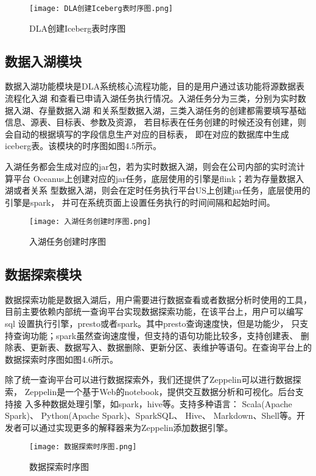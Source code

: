 \begin{figure}[h]
  \centering
  \texttt{[image: DLA创建Iceberg表时序图.png]}
  \caption{DLA创建Iceberg表时序图}
  \label{fig:badge}
\end{figure}

\subsection{数据入湖模块}

数据入湖功能模块是DLA系统核心流程功能，目的是用户通过该功能将源数据表流程化入湖
和查看已申请入湖任务执行情况。入湖任务分为三类，分别为实时数据入湖、存量数据入湖
和关系型数据入湖，三类入湖任务的创建都需要填写基础信息、源表、目标表、参数及资源，
若目标表在任务创建的时候还没有创建，则会自动的根据填写的字段信息生产对应的目标表，
即在对应的数据库中生成iceberg表。该模块的时序图如图4.5所示。

入湖任务都会生成对应的jar包，若为实时数据入湖，则会在公司内部的实时流计算平台
Oceanus上创建对应的jar任务，底层使用的引擎是flink；若为存量数据入湖或者关系
型数据入湖，则会在定时任务执行平台US上创建jar任务，底层使用的引擎是spark，
并可在系统页面上设置任务执行的时间间隔和起始时间。

\begin{figure}[h]
  \centering
  \texttt{[image: 入湖任务创建时序图.png]}
  \caption{入湖任务创建时序图}
  \label{fig:badge}
\end{figure}

\subsection{数据探索模块}

数据探索功能是数据入湖后，用户需要进行数据查看或者数据分析时使用的工具，
目前主要依赖内部统一查询平台实现数据探索功能，在该平台上，用户可以编写sql
设置执行引擎，presto或者spark。其中presto查询速度快，但是功能少，
只支持查询功能；spark虽然查询速度慢，但支持的语句功能比较多，支持创建表、
删除表、更新表、数据写入、数据删除、更新分区、表维护等语句。在查询平台上的数据探索时序图如图4.6所示。

除了统一查询平台可以进行数据探索外，我们还提供了Zeppelin可以进行数据探索，
Zeppelin是一个基于Web的notebook，提供交互数据分析和可视化。后台支持接
入多种数据处理引擎，如spark，hive等。支持多种语言： Scala(Apache Spark)、
Python(Apache Spark)、SparkSQL、 Hive、 Markdown、Shell等。开发者可以通过实现更多的解释器来为Zeppelin添加数据引擎。

\begin{figure}[h]
  \centering
  \texttt{[image: 数据探索时序图.png]}
  \caption{数据探索时序图}
  \label{fig:badge}
\end{figure}

